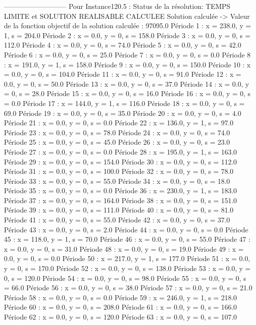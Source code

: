 ---------------------------
Pour Instance120.5 :
Status de la résolution: TEMPS LIMITE et SOLUTION REALISABLE CALCULEE
Solution calculée
-> Valeur de la fonction objectif de la solution calculée :  97095.0
Période 1 : x = 238.0, y = 1, s = 204.0
Période 2 : x = 0.0, y = 0, s = 158.0
Période 3 : x = 0.0, y = 0, s = 112.0
Période 4 : x = 0.0, y = 0, s = 74.0
Période 5 : x = 0.0, y = 0, s = 42.0
Période 6 : x = 0.0, y = 0, s = 25.0
Période 7 : x = 0.0, y = 0, s = 0.0
Période 8 : x = 191.0, y = 1, s = 158.0
Période 9 : x = 0.0, y = 0, s = 150.0
Période 10 : x = 0.0, y = 0, s = 104.0
Période 11 : x = 0.0, y = 0, s = 91.0
Période 12 : x = 0.0, y = 0, s = 50.0
Période 13 : x = 0.0, y = 0, s = 37.0
Période 14 : x = 0.0, y = 0, s = 28.0
Période 15 : x = 0.0, y = 0, s = 16.0
Période 16 : x = 0.0, y = 0, s = 0.0
Période 17 : x = 144.0, y = 1, s = 116.0
Période 18 : x = 0.0, y = 0, s = 69.0
Période 19 : x = 0.0, y = 0, s = 35.0
Période 20 : x = 0.0, y = 0, s = 4.0
Période 21 : x = 0.0, y = 0, s = 0.0
Période 22 : x = 136.0, y = 1, s = 97.0
Période 23 : x = 0.0, y = 0, s = 78.0
Période 24 : x = 0.0, y = 0, s = 74.0
Période 25 : x = 0.0, y = 0, s = 45.0
Période 26 : x = 0.0, y = 0, s = 23.0
Période 27 : x = 0.0, y = 0, s = 0.0
Période 28 : x = 195.0, y = 1, s = 163.0
Période 29 : x = 0.0, y = 0, s = 154.0
Période 30 : x = 0.0, y = 0, s = 112.0
Période 31 : x = 0.0, y = 0, s = 100.0
Période 32 : x = 0.0, y = 0, s = 78.0
Période 33 : x = 0.0, y = 0, s = 55.0
Période 34 : x = 0.0, y = 0, s = 18.0
Période 35 : x = 0.0, y = 0, s = 0.0
Période 36 : x = 230.0, y = 1, s = 183.0
Période 37 : x = 0.0, y = 0, s = 164.0
Période 38 : x = 0.0, y = 0, s = 151.0
Période 39 : x = 0.0, y = 0, s = 111.0
Période 40 : x = 0.0, y = 0, s = 81.0
Période 41 : x = 0.0, y = 0, s = 55.0
Période 42 : x = 0.0, y = 0, s = 37.0
Période 43 : x = 0.0, y = 0, s = 2.0
Période 44 : x = 0.0, y = 0, s = 0.0
Période 45 : x = 118.0, y = 1, s = 70.0
Période 46 : x = 0.0, y = 0, s = 55.0
Période 47 : x = 0.0, y = 0, s = 31.0
Période 48 : x = 0.0, y = 0, s = 19.0
Période 49 : x = 0.0, y = 0, s = 0.0
Période 50 : x = 217.0, y = 1, s = 177.0
Période 51 : x = 0.0, y = 0, s = 170.0
Période 52 : x = 0.0, y = 0, s = 138.0
Période 53 : x = 0.0, y = 0, s = 120.0
Période 54 : x = 0.0, y = 0, s = 98.0
Période 55 : x = 0.0, y = 0, s = 66.0
Période 56 : x = 0.0, y = 0, s = 38.0
Période 57 : x = 0.0, y = 0, s = 21.0
Période 58 : x = 0.0, y = 0, s = 0.0
Période 59 : x = 246.0, y = 1, s = 218.0
Période 60 : x = 0.0, y = 0, s = 208.0
Période 61 : x = 0.0, y = 0, s = 166.0
Période 62 : x = 0.0, y = 0, s = 120.0
Période 63 : x = 0.0, y = 0, s = 107.0

